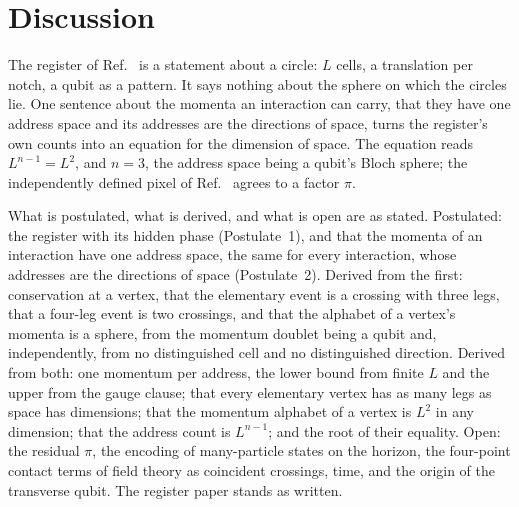 \documentclass[aps,prd,twocolumn,superscriptaddress,nofootinbib]{revtex4-2}
\begin{document}
\section{Discussion}
\label{sec:discussion}

The register of Ref.~\cite{korytko2026c} is a statement about a circle: $L$ cells, a translation per notch, a qubit as a pattern. It says nothing about the sphere on which the circles lie. One sentence about the momenta an interaction can carry, that they have one address space and its addresses are the directions of space, turns the register's own counts into an equation for the dimension of space. The equation reads $L^{n-1} = L^2$, and $n = 3$, the address space being a qubit's Bloch sphere; the independently defined pixel of Ref.~\cite{korytko2026} agrees to a factor $\pi$.

What is postulated, what is derived, and what is open are as stated. Postulated: the register with its hidden phase (Postulate~1), and that the momenta of an interaction have one address space, the same for every interaction, whose addresses are the directions of space (Postulate~2). Derived from the first: conservation at a vertex, that the elementary event is a crossing with three legs, that a four-leg event is two crossings, and that the alphabet of a vertex's momenta is a sphere, from the momentum doublet being a qubit and, independently, from no distinguished cell and no distinguished direction. Derived from both: one momentum per address, the lower bound from finite $L$ and the upper from the gauge clause; that every elementary vertex has as many legs as space has dimensions; that the momentum alphabet of a vertex is $L^2$ in any dimension; that the address count is $L^{n-1}$; and the root of their equality. Open: the residual $\pi$, the encoding of many-particle states on the horizon, the four-point contact terms of field theory as coincident crossings, time, and the origin of the transverse qubit. The register paper stands as written.
\end{document}
